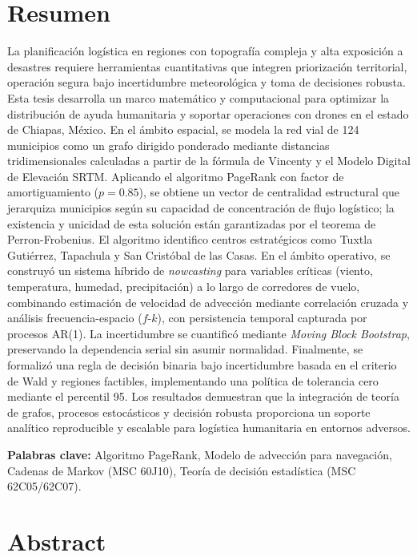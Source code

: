 \documentclass[
  spanish,
  us-letterpaper,
]{scrreprt}
\numberwithin{equation}{section}
\begin{document}
\section*{Resumen}\label{resumen}


La planificación logística en regiones con topografía compleja y alta
exposición a desastres requiere herramientas cuantitativas que integren
priorización territorial, operación segura bajo incertidumbre
meteorológica y toma de decisiones robusta. Esta tesis desarrolla un
marco matemático y computacional para optimizar la distribución de ayuda
humanitaria y soportar operaciones con drones en el estado de Chiapas,
México. En el ámbito espacial, se modela la red vial de 124 municipios
como un grafo dirigido ponderado mediante distancias tridimensionales
calculadas a partir de la fórmula de Vincenty y el Modelo Digital de
Elevación SRTM. Aplicando el algoritmo PageRank con factor de
amortiguamiento (\(p=0.85\)), se obtiene un vector de centralidad
estructural que jerarquiza municipios según su capacidad de
concentración de flujo logístico; la existencia y unicidad de esta
solución están garantizadas por el teorema de Perron-Frobenius. El
algoritmo identifico centros estratégicos como Tuxtla Gutiérrez,
Tapachula y San Cristóbal de las Casas. En el ámbito operativo, se
construyó un sistema híbrido de \emph{nowcasting} para variables
críticas (viento, temperatura, humedad, precipitación) a lo largo de
corredores de vuelo, combinando estimación de velocidad de advección
mediante correlación cruzada y análisis frecuencia-espacio
(\(f\)-\(k\)), con persistencia temporal capturada por procesos AR(1).
La incertidumbre se cuantificó mediante \emph{Moving Block Bootstrap},
preservando la dependencia serial sin asumir normalidad. Finalmente, se
formalizó una regla de decisión binaria bajo incertidumbre basada en el
criterio de Wald y regiones factibles, implementando una política de
tolerancia cero mediante el percentil 95. Los resultados demuestran que
la integración de teoría de grafos, procesos estocásticos y decisión
robusta proporciona un soporte analítico reproducible y escalable para
logística humanitaria en entornos adversos.

\textbf{Palabras clave:} Algoritmo PageRank, Modelo de advección para
navegación, Cadenas de Markov (MSC 60J10), Teoría de decisión
estadística (MSC 62C05/62C07).

\section*{Abstract}\label{abstract}
\end{document}
